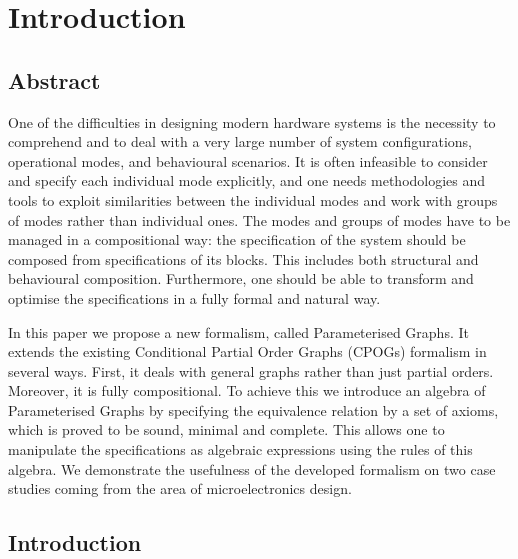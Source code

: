 \section{Introduction}

\subsection{Abstract}

One of the difficulties in designing modern hardware systems is the
necessity to comprehend and to deal with a very large number of system
configurations, operational modes, and behavioural scenarios. It is
often infeasible to consider and specify each individual mode explicitly,
and one needs methodologies and tools to exploit similarities between
the individual modes and work with groups of modes rather than individual
ones. The modes and groups of modes have to be managed in a compositional
way: the specification of the system should be composed from specifications
of its blocks. This includes both structural and behavioural composition.
Furthermore, one should be able to transform and optimise the specifications
in a fully formal and natural way.

In this paper we propose a new formalism, called Parameterised Graphs.
It extends the existing Conditional Partial Order Graphs (CPOGs) formalism
in several ways. First, it deals with general graphs rather than just
partial orders. Moreover, it is fully compositional. To achieve this
we introduce an algebra of Parameterised Graphs by specifying the
equivalence relation by a set of axioms, which is proved to be sound,
minimal and complete. This allows one to manipulate the specifications
as algebraic expressions using the rules of this algebra. We demonstrate
the usefulness of the developed formalism on two case studies coming
from the area of microelectronics design.

\subsection{Introduction}

